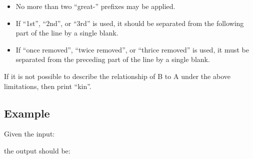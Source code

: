 \begin{itemize}
\item No more than two ``great-'' prefixes may be applied.

\item If  ``1st'', ``2nd'', or ``3rd'' is used, it should be separated from
  the following part of the line by a single blank.

\item If ``once removed'', ``twice removed'', or ``thrice removed'' is used,
  it must be separated from the preceding part of the line by a single
  blank.
\end{itemize}

If it is not possible to describe the relationship of B to A under the
above limitations, then print ``kin''.

\subsection*{Example}

Given the input:



the output should be:




